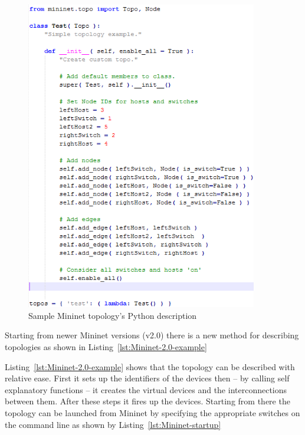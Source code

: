 \documentclass{article}
\begin{document}
\begin{figure}[H]%
    \centering
    \includegraphics[width=0.9\textwidth]{figures/mininet-code.png}
    \caption{Sample Mininet topology's Python description}
    \label{fig:Mininet-sample-topo-code}
\end{figure}

Starting from newer Mininet versions (v2.0) there is a new method for describing topologies as shown in Listing~\ref{lst:Mininet-2.0-example}



Listing~\ref{lst:Mininet-2.0-example} shows that the topology can be described with relative ease. First it sets up the identifiers of the devices then -- by calling self explanatory functions -- it creates the virtual devices and the interconnections between them. After these steps it fires up the devices. Starting from there the topology can be launched from Mininet by specifying the appropriate switches on the command line as shown by Listing~\ref{lst:Mininet-startup}
\end{document}
